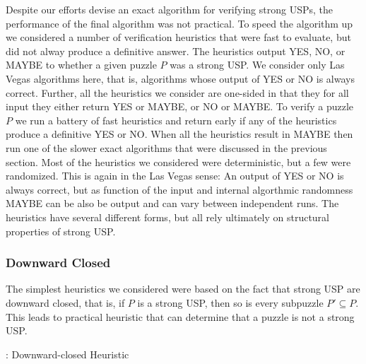 \documentclass[11pt]{article}
\newcommand\sse{\subseteq}
\begin{document}
Despite our efforts devise an exact algorithm for verifying strong
USPs, the performance of the final algorithm was not practical.  To
speed the algorithm up we considered a number of verification
heuristics that were fast to evaluate, but did not alway produce a
definitive answer.  The heuristics output YES, NO, or MAYBE to whether
a given puzzle $P$ was a strong USP.  We consider only Las Vegas
algorithms here, that is, algorithms whose output of YES or NO is
always correct.  Further, all the heuristics we consider are one-sided
in that they for all input they either return YES or MAYBE, or NO or
MAYBE.  To verify a puzzle $P$ we run a battery of fast heuristics and
return early if any of the heuristics produce a definitive YES or NO.
When all the heuristics result in MAYBE then run one of the slower
exact algorithms that were discussed in the previous section.  Most of
the heuristics we considered were deterministic, but a few were
randomized.  This is again in the Las Vegas sense: An output of YES or
NO is always correct, but as function of the input and internal
algorthmic randomness MAYBE can be also be output and can vary between
independent runs.  The heuristics have several different forms, but
all rely ultimately on structural properties of strong USP.

\subsubsection{Downward Closed}

The simplest heuristics we considered were based on the fact that
strong USP are downward closed, that is, if $P$ is a strong USP, then
so is every subpuzzle $P' \sse P$.  This leads to practical heuristic
that can determine that a puzzle is not a strong USP.

\begin{algorithm}
  \caption{: Downward-closed Heuristic}
  \label{alg:downward-closed}
\begin{algorithmic}[1]
  \For{$P' \sse P, |P'| = s'$}
        \EndIf
  \EndFor{}
  \EndFunction
\end{algorithmic}
\end{algorithm}
\end{document}
